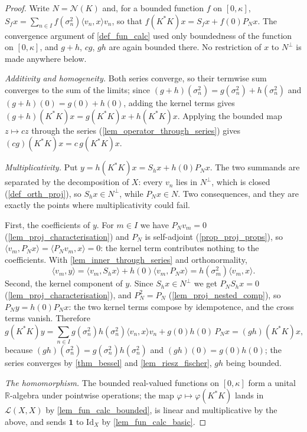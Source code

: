 \documentclass[a4paper]{report}
\theoremstyle{plain}
\theoremstyle{definition}
\theoremstyle{remark}
\begin{document}
\begin{proof}
  Write $N = \mathcal{N}(K)$ and, for a bounded function $f$ on $[0,\kappa]$,
  $S_fx = \sum_{n\in I}f(\sigma_n^2)\langle v_n,x\rangle v_n$, so that
  $f(K^*K)x = S_fx + f(0)P_Nx$.  The convergence argument of \cref{def_fun_calc} used only
  boundedness of the function on $[0,\kappa]$, and $g+h$, $cg$, $gh$ are again bounded
  there.  No restriction of $x$ to $N^\perp$ is made anywhere below.

  \emph{Additivity and homogeneity.}  Both series converge, so their termwise sum converges
  to the sum of the limits; since
  $(g+h)(\sigma_n^2) = g(\sigma_n^2) + h(\sigma_n^2)$ and $(g+h)(0) = g(0)+h(0)$, adding
  the kernel terms gives $(g+h)(K^*K)x = g(K^*K)x + h(K^*K)x$.  Applying the bounded map
  $z \mapsto cz$ through the series (\cref{lem_operator_through_series}) gives
  $(cg)(K^*K)x = c\,g(K^*K)x$.

  \emph{Multiplicativity.}  Put $y = h(K^*K)x = S_hx + h(0)P_Nx$.  The two summands are
  separated by the decomposition of $X$: every $v_n$ lies in $N^\perp$, which is closed
  (\cref{def_orth_proj}), so $S_hx \in N^\perp$, while $P_Nx \in N$.  Two consequences, and
  they are exactly the points where multiplicativity could fail.

  First, the coefficients of $y$.  For $m \in I$ we have $P_Nv_m = 0$
  (\cref{lem_proj_characterisation}) and $P_N$ is self-adjoint (\cref{prop_proj_props}), so
  $\langle v_m, P_Nx\rangle = \langle P_Nv_m, x\rangle = 0$: the kernel term contributes
  nothing to the coefficients.  With \cref{lem_inner_through_series} and orthonormality,
  \[
    \langle v_m, y\rangle = \langle v_m, S_hx\rangle + h(0)\langle v_m,P_Nx\rangle
      = h(\sigma_m^2)\langle v_m,x\rangle .
  \]
  Second, the kernel component of $y$.  Since $S_hx \in N^\perp$ we get $P_NS_hx = 0$
  (\cref{lem_proj_characterisation}), and $P_N^2 = P_N$ (\cref{lem_proj_nested_comp}), so
  $P_Ny = h(0)P_Nx$: the two kernel terms compose by idempotence, and the cross terms
  vanish.  Therefore
  \[
    g(K^*K)y
      = \sum_{n \in I}g(\sigma_n^2)h(\sigma_n^2)\langle v_n,x\rangle v_n
        + g(0)h(0)\,P_Nx
      = (gh)(K^*K)x ,
  \]
  because $(gh)(\sigma_n^2) = g(\sigma_n^2)h(\sigma_n^2)$ and $(gh)(0) = g(0)h(0)$; the
  series converges by \cref{thm_bessel} and \cref{lem_riesz_fischer}, $gh$ being bounded.

  \emph{The homomorphism.}  The bounded real-valued functions on $[0,\kappa]$ form a
  unital $\mathbb{R}$-algebra under pointwise operations; the map $\varphi \mapsto \varphi(K^*K)$
  lands in $\mathcal{L}(X,X)$ by \cref{lem_fun_calc_bounded}, is linear and multiplicative
  by the above, and sends $\mathbf{1}$ to $\mathrm{Id}_X$ by \cref{lem_fun_calc_basic}.


\end{proof}
\end{document}
